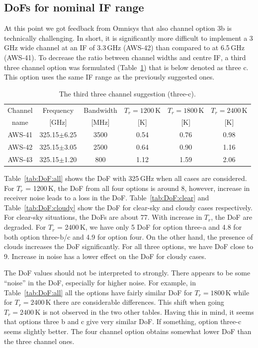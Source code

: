 \documentclass[12pt]{article}
\begin{document}
\subsection{DoFs for nominal IF range}

At this point we got feedback from Omnisys that also channel option 3b is
technically challenging. In short, it is significantly more difficult to
implement a 3\,GHz wide channel at an IF of 3.3\,GHz (AWS-42) than compared to
at 6.5\,GHz (AWS-41). To decrease the ratio between channel widths and centre
IF, a third three channel option was formulated (Table~\ref{tab:chs:3c}) that
is below denoted as three c. This option uses the same IF range as the
previously suggested ones.

\begin{table}[!p]
  \centering  
  \begin{tabular}[c]{c|c|c|ccc}
    Channel & Frequency   & Bandwidth & $T_r=1200$\,K
    & $T_r=1800$\,K & $T_r=2400$\,K\\
    name    & [GHz] &  [MHz] & [K]  & [K] & [K]\\
    \hline
    AWS-41  & 325.15$\pm$6.25 & 3500  & 0.54 & 0.76 & 0.98\\
    AWS-42  & 325.15$\pm$3.05 & 2500  & 0.64 & 0.90 & 1.16\\
    AWS-43  & 325.15$\pm$1.20 & \phantom{0}800 & 1.12 & 1.59 & 2.06\\
    \hline
  \end{tabular}
  \caption{The third three channel suggestion (three-c).}
  \label{tab:chs:3c}
\end{table}


Table~\ref{tab:DoF:all} shows the DoF with 325\,GHz when all cases are
considered. For $T_r$ = 1200\,K, the DoF from all four options is around 8,
however, increase in receiver noise leads to a loss in the DoF.
Table~\ref{tab:DoF:clear} and Table~\ref{tab:DoF:cloudy} show the DoF for
clear-sky and cloudy cases respectively. For clear-sky situations, the DoFs are
about 77. With increase in $T_r$, the DoF are degraded. For $T_r$ = 2400\,K, we
have only 5 DoF for option three-a and 4.8 for both option three-b/c and 4.9
for option four. On the other hand, the presence of clouds increases the DoF
significantly. For all three options, we have DoF close to 9. Increase in noise
has a lower effect on the DoF for cloudy cases.

The DoF values should not be interpreted to strongly. There appears to be some
``noise'' in the DoF, especially for higher noise. For example, in
Table~\ref{tab:DoF:all} all the options have fairly similar DoF for
$T_r=1800$\,K while for $T_r=2400$\,K there are considerable differences. This
shift when going $T_r=2400$\,K is not observed in the two other tables. Having
this in mind, it seems that options three b and c give very similar DoF. If
something, option three-c seems slightly better. The four channel option
obtains somewhat lower DoF than the three channel ones.
\end{document}
